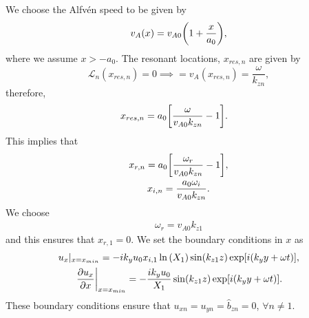 We choose the Alfv\'en speed to be given by
\begin{equation}
    v_A(x)=v_{A0}\qty(1+\frac{x}{a_0}),
\end{equation}
where we assume $x>-a_0$.
The resonant locations, $x_{res,n}$ are given by
\[\mathcal{L}_n(x_{res,n})=0 \implies = v_A(x_{res,n}) = \frac{\omega}{k_{zn}},\]
therefore,
\begin{equation}
\begin{aligned}
    x_{res,n} &= a_0\qty[\frac{\omega}{v_{A0}k_{zn}} - 1].
\end{aligned}
\end{equation}
This implies that
\begin{gather}
    x_{r,n} = a_0\qty[\frac{\omega_r}{v_{A0}k_{zn}} - 1], \\
    x_{i,n} = \frac{a_0\omega_i}{v_{A0}k_{zn}}.
\end{gather}
We choose
\begin{equation}
    \begin{aligned}
    \omega_r = v_{A0}k_{z1}
    \end{aligned}
\end{equation}
and this ensures that $x_{r,1}=0$.
We set the boundary conditions in $x$ as
\begin{gather}
    u_x|_{x=x_{min}} = -ik_yu_0x_{i,1}\ln\qty(X_1)\sin(k_{z1}z)\exp[i(k_y y + \omega t)], \\
    \left.\pdv{u_x}{x}\right|_{x=x_{min}}=-\frac{ik_yu_0}{X_1}\sin(k_{z1}z)\exp[i(k_y y + \omega t)].
\end{gather}
These boundary conditions ensure that $u_{xn}=u_{yn}=\hat{b}_{zn}=0$, $\forall n\ne 1$.

